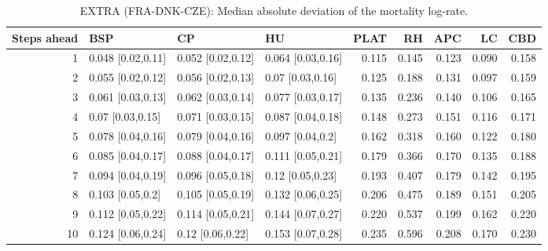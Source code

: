 % 
\begin{table}[ht]
\centering
\begin{tabular}{rlllrrrrr}
  \hline
Steps ahead & BSP & CP & HU & PLAT & RH & APC & LC & CBD \\ 
  \hline
   1 & 0.048 [0.02,0.11] & 0.052 [0.02,0.12] & 0.064 [0.03,0.16] & 0.115 & 0.145 & 0.123 & 0.090 & 0.158 \\ 
     2 & 0.055 [0.02,0.12] & 0.056 [0.02,0.13] & 0.07 [0.03,0.16] & 0.125 & 0.188 & 0.131 & 0.097 & 0.159 \\ 
     3 & 0.061 [0.03,0.13] & 0.062 [0.03,0.14] & 0.077 [0.03,0.17] & 0.135 & 0.236 & 0.140 & 0.106 & 0.165 \\ 
     4 & 0.07 [0.03,0.15] & 0.071 [0.03,0.15] & 0.087 [0.04,0.18] & 0.148 & 0.273 & 0.151 & 0.116 & 0.171 \\ 
     5 & 0.078 [0.04,0.16] & 0.079 [0.04,0.16] & 0.097 [0.04,0.2] & 0.162 & 0.318 & 0.160 & 0.122 & 0.180 \\ 
     6 & 0.085 [0.04,0.17] & 0.088 [0.04,0.17] & 0.111 [0.05,0.21] & 0.179 & 0.366 & 0.170 & 0.135 & 0.188 \\ 
     7 & 0.094 [0.04,0.19] & 0.096 [0.05,0.18] & 0.12 [0.05,0.23] & 0.193 & 0.407 & 0.179 & 0.142 & 0.195 \\ 
     8 & 0.103 [0.05,0.2] & 0.105 [0.05,0.19] & 0.132 [0.06,0.25] & 0.206 & 0.475 & 0.189 & 0.151 & 0.205 \\ 
     9 & 0.112 [0.05,0.22] & 0.114 [0.05,0.21] & 0.144 [0.07,0.27] & 0.220 & 0.537 & 0.199 & 0.162 & 0.220 \\ 
    10 & 0.124 [0.06,0.24] & 0.12 [0.06,0.22] & 0.153 [0.07,0.28] & 0.235 & 0.596 & 0.208 & 0.170 & 0.230 \\ 
   \hline
\end{tabular}
\caption{EXTRA (FRA-DNK-CZE): Median absolute deviation of the mortality log-rate.} 
\end{table}
